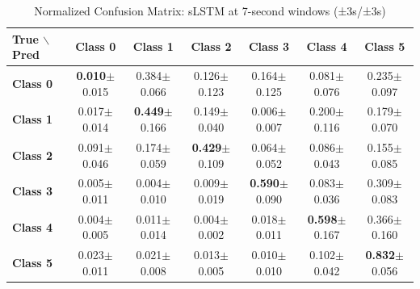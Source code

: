 \begin{table}[htbp]
\centering
\caption{Normalized Confusion Matrix: sLSTM at 7-second windows (±3s/±3s)}
\label{tab:app_cm_slstm_7s}
\small
\setlength{\tabcolsep}{2pt}
\begin{tabular}{lcccccc}
	\toprule
	\textbf{True $\backslash$ Pred} & \textbf{Class 0} & \textbf{Class 1} & \textbf{Class 2} & \textbf{Class 3} & \textbf{Class 4} & \textbf{Class 5} \\
\midrule
	\textbf{Class 0} & \textbf{0.010}$\pm$0.015 & 0.384$\pm$0.066 & 0.126$\pm$0.123 & 0.164$\pm$0.125 & 0.081$\pm$0.076 & 0.235$\pm$0.097 \\
	\textbf{Class 1} & 0.017$\pm$0.014 & \textbf{0.449}$\pm$0.166 & 0.149$\pm$0.040 & 0.006$\pm$0.007 & 0.200$\pm$0.116 & 0.179$\pm$0.070 \\
	\textbf{Class 2} & 0.091$\pm$0.046 & 0.174$\pm$0.059 & \textbf{0.429}$\pm$0.109 & 0.064$\pm$0.052 & 0.086$\pm$0.043 & 0.155$\pm$0.085 \\
	\textbf{Class 3} & 0.005$\pm$0.011 & 0.004$\pm$0.010 & 0.009$\pm$0.019 & \textbf{0.590}$\pm$0.090 & 0.083$\pm$0.036 & 0.309$\pm$0.083 \\
	\textbf{Class 4} & 0.004$\pm$0.005 & 0.011$\pm$0.014 & 0.004$\pm$0.002 & 0.018$\pm$0.011 & \textbf{0.598}$\pm$0.167 & 0.366$\pm$0.160 \\
	\textbf{Class 5} & 0.023$\pm$0.011 & 0.021$\pm$0.008 & 0.013$\pm$0.005 & 0.010$\pm$0.010 & 0.102$\pm$0.042 & \textbf{0.832}$\pm$0.056 \\
\bottomrule
\end{tabular}
\setlength{\tabcolsep}{6pt}
\end{table}

